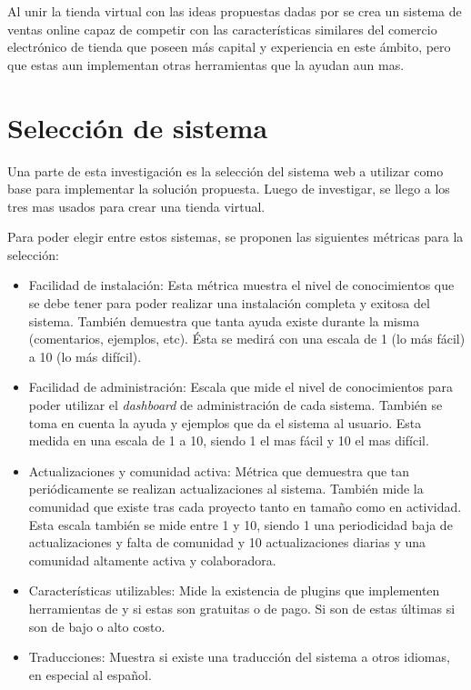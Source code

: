 Al unir la tienda virtual con las ideas propuestas dadas por {\GAM} se crea un
sistema de ventas online capaz de competir con las características similares del
comercio electrónico de tienda que poseen más capital y experiencia en este ámbito,
pero que estas aun implementan otras herramientas que la ayudan aun mas.

\section{Selección de sistema}

Una parte de esta investigación es la selección del sistema web a utilizar como
base para implementar la solución propuesta. Luego de investigar, se llego a los
tres mas usados para crear una tienda virtual.

Para poder elegir entre estos sistemas, se proponen las siguientes métricas para
la selección:

\begin{itemize}

    \item Facilidad de instalación:
        Esta métrica muestra el nivel de conocimientos que se debe
        tener para poder realizar una instalación completa y exitosa del sistema.
        También demuestra que tanta ayuda existe durante la misma (comentarios,
        ejemplos, etc).
        Ésta se medirá con una escala de 1 (lo más fácil) a 10 (lo más difícil).

    \item Facilidad de administración:
        Escala que mide el nivel de conocimientos para poder utilizar el
        \emph{dashboard} de administración de cada sistema.
        También se toma en cuenta la ayuda y ejemplos que da el sistema al usuario.
        Esta medida en una escala de 1 a 10, siendo 1 el mas fácil y 10 el mas
        difícil.

    \item Actualizaciones y comunidad activa:
        Métrica que demuestra que tan periódicamente se realizan actualizaciones
        al sistema.
        También mide la comunidad que existe tras cada proyecto tanto en tamaño
        como en actividad.
        Esta escala también se mide entre 1 y 10, siendo 1 una periodicidad baja
        de actualizaciones y falta de comunidad y 10 actualizaciones diarias y
        una comunidad altamente activa y colaboradora.

    \item Características utilizables:
        Mide la existencia de plugins que implementen herramientas de {\GAM}
        y si estas son gratuitas o de pago.
        Si son de estas últimas si son de bajo o alto costo.

    \item Traducciones:
        Muestra si existe una traducción del sistema a otros idiomas, en especial
        al español.

\end{itemize}


